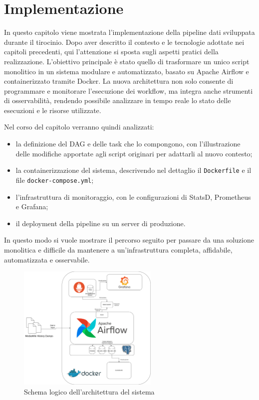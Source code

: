 \chapter{Implementazione}
\label{cha:implementazione}

In questo capitolo viene mostrata l'implementazione della pipeline dati sviluppata durante
il tirocinio. Dopo aver descritto il contesto e le tecnologie adottate nei capitoli precedenti, qui l’attenzione si sposta sugli aspetti pratici della realizzazione.
L’obiettivo principale è stato quello di trasformare un unico script monolitico in un sistema modulare e automatizzato, basato su Apache Airflow e containerizzato tramite Docker. La nuova architettura non solo consente di programmare e monitorare l’esecuzione dei workflow, ma integra anche strumenti di osservabilità, rendendo possibile analizzare in tempo reale lo stato delle esecuzioni e le risorse utilizzate.

Nel corso del capitolo verranno quindi analizzati:


\begin{itemize}
    \item la definizione del DAG e delle task che lo compongono, con l’illustrazione delle modifiche apportate agli script originari per adattarli al nuovo contesto;
    \item la containerizzazione del sistema, descrivendo nel dettaglio il \texttt{Dockerfile} e il file \texttt{docker-compose.yml};
    \item l’infrastruttura di monitoraggio, con le configurazioni di StatsD, Prometheus e Grafana;
    \item il deployment della pipeline su un server di produzione.
\end{itemize}

In questo modo si vuole mostrare il percorso seguito per passare da una soluzione monolitica e difficile da mantenere a un’infrastruttura completa, affidabile, automatizzata e osservabile.

\begin{figure}[ht]
    \centering
    \includegraphics[width=0.6\textwidth]{img/vital-signs-pipeline.drawio.png}
    \caption{Schema logico dell'architettura del sistema}
    \label{fig:architettura_sistema}
\end{figure}

